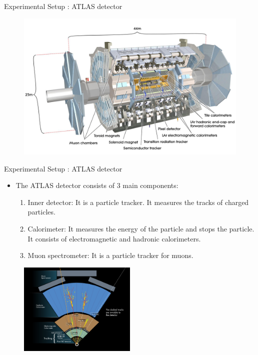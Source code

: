 \documentclass[mathserif,serif]{beamer}
\begin{document}
\begin{frame}{Experimental Setup : ATLAS detector}
\begin{figure}
\centering
\includegraphics[width=\textwidth]{data/photo/detector/ATLAS.jpg}
\end{figure}
\end{frame}

\begin{frame}{Experimental Setup : ATLAS detector}
\begin{itemize}
\item The ATLAS detector consists of 3 main components:
\begin{enumerate}
\item Inner detector: It is a particle tracker. It measures the tracks of charged particles.
\item Calorimeter: It measures the energy of the particle and stops the particle. It consists of electromagnetic and hadronic calorimeters.
\item Muon spectrometer:  It is a particle tracker for muons.
\end{enumerate}
\end{itemize}
\begin{figure}
\centering
\includegraphics[width=0.5\textwidth]{data/photo/detector/ATLAS_particles.jpg}
\end{figure}
\end{frame}
\end{document}
